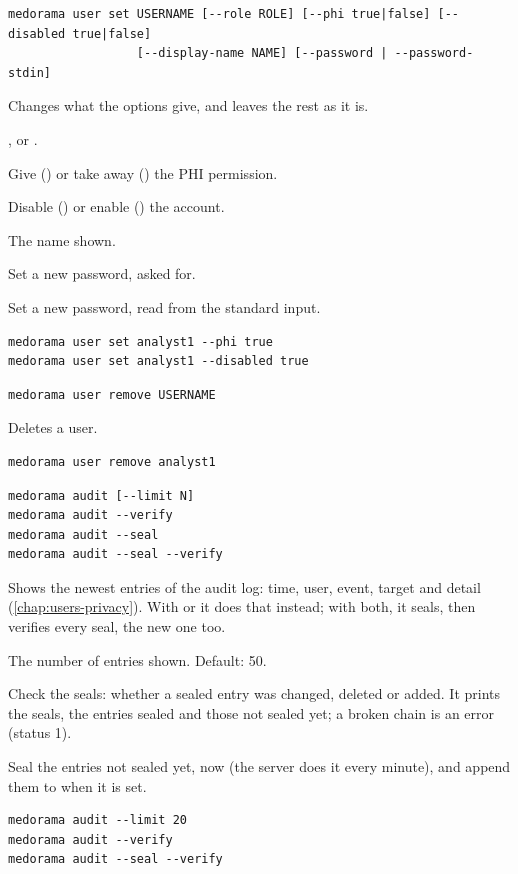 \begin{lstlisting}[style=signature]
medorama user set USERNAME [--role ROLE] [--phi true|false] [--disabled true|false]
                  [--display-name NAME] [--password | --password-stdin]
\end{lstlisting}
Changes what the options give, and leaves the rest as it is.
\begin{params}
\item[--role ROLE] ,  or .
\item[--phi BOOL] Give () or take away () the PHI permission.
\item[--disabled BOOL] Disable () or enable () the account.
\item[--display-name NAME] The name shown.
\item[--password] Set a new password, asked for.
\item[--password-stdin] Set a new password, read from the standard input.
\end{params}
\begin{lstlisting}[style=shell]
medorama user set analyst1 --phi true
medorama user set analyst1 --disabled true
\end{lstlisting}

\begin{lstlisting}[style=signature]
medorama user remove USERNAME
\end{lstlisting}
Deletes a user.
\begin{lstlisting}[style=shell]
medorama user remove analyst1
\end{lstlisting}

\begin{lstlisting}[style=signature]
medorama audit [--limit N]
medorama audit --verify
medorama audit --seal
medorama audit --seal --verify
\end{lstlisting}
Shows the newest entries of the audit log: time, user, event, target and detail
(\cref{chap:users-privacy}). With  or  it does that instead; with
both, it seals, then verifies every seal, the new one too.
\begin{params}
\item[--limit N] The number of entries shown. Default: 50.
\item[--verify] Check the seals: whether a sealed entry was changed, deleted or added. It prints
  the seals, the entries sealed and those not sealed yet; a broken chain is an error (status 1).
\item[--seal] Seal the entries not sealed yet, now (the server does it every minute), and append
  them to  when it is set.
\end{params}
\begin{lstlisting}[style=shell]
medorama audit --limit 20
medorama audit --verify
medorama audit --seal --verify
\end{lstlisting}

